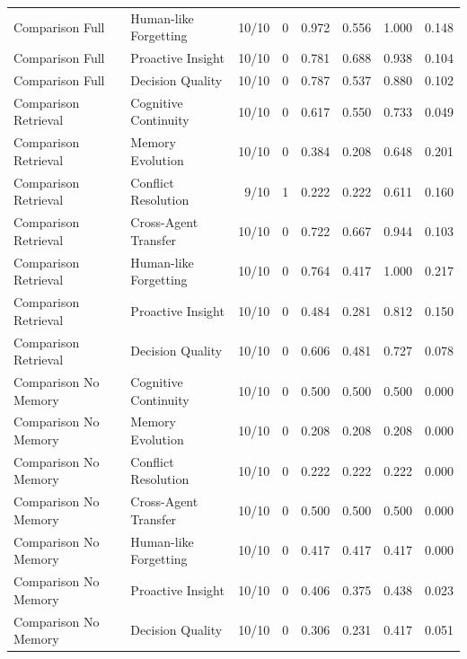 \begin{table}[t]
\begin{tabular}{llrrrrrr}
Comparison Full & Human-like Forgetting & 10/10 & 0 & 0.972 & 0.556 & 1.000 & 0.148 \\
Comparison Full & Proactive Insight & 10/10 & 0 & 0.781 & 0.688 & 0.938 & 0.104 \\
Comparison Full & Decision Quality & 10/10 & 0 & 0.787 & 0.537 & 0.880 & 0.102 \\
Comparison Retrieval & Cognitive Continuity & 10/10 & 0 & 0.617 & 0.550 & 0.733 & 0.049 \\
Comparison Retrieval & Memory Evolution & 10/10 & 0 & 0.384 & 0.208 & 0.648 & 0.201 \\
Comparison Retrieval & Conflict Resolution & 9/10 & 1 & 0.222 & 0.222 & 0.611 & 0.160 \\
Comparison Retrieval & Cross-Agent Transfer & 10/10 & 0 & 0.722 & 0.667 & 0.944 & 0.103 \\
Comparison Retrieval & Human-like Forgetting & 10/10 & 0 & 0.764 & 0.417 & 1.000 & 0.217 \\
Comparison Retrieval & Proactive Insight & 10/10 & 0 & 0.484 & 0.281 & 0.812 & 0.150 \\
Comparison Retrieval & Decision Quality & 10/10 & 0 & 0.606 & 0.481 & 0.727 & 0.078 \\
Comparison No Memory & Cognitive Continuity & 10/10 & 0 & 0.500 & 0.500 & 0.500 & 0.000 \\
Comparison No Memory & Memory Evolution & 10/10 & 0 & 0.208 & 0.208 & 0.208 & 0.000 \\
Comparison No Memory & Conflict Resolution & 10/10 & 0 & 0.222 & 0.222 & 0.222 & 0.000 \\
Comparison No Memory & Cross-Agent Transfer & 10/10 & 0 & 0.500 & 0.500 & 0.500 & 0.000 \\
Comparison No Memory & Human-like Forgetting & 10/10 & 0 & 0.417 & 0.417 & 0.417 & 0.000 \\
Comparison No Memory & Proactive Insight & 10/10 & 0 & 0.406 & 0.375 & 0.438 & 0.023 \\
Comparison No Memory & Decision Quality & 10/10 & 0 & 0.306 & 0.231 & 0.417 & 0.051 \\
\bottomrule
\end{tabular}
\end{table}
